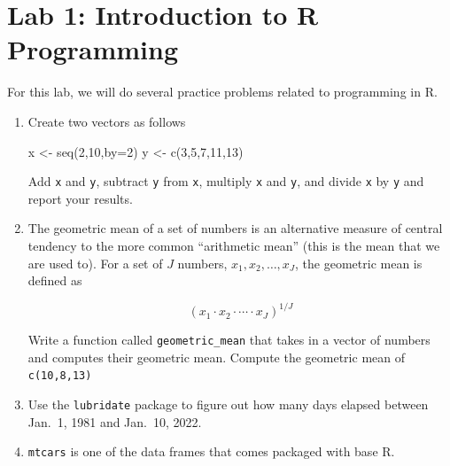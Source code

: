 \documentclass[
  letterpaper,
  DIV=11,
  numbers=noendperiod]{scrreprt}
\newenvironment{Shaded}{\begin{snugshade}}{\end{snugshade}}
\newcommand{\AttributeTok}[1]{\textcolor[rgb]{0.40,0.45,0.13}{#1}}
\newcommand{\DecValTok}[1]{\textcolor[rgb]{0.68,0.00,0.00}{#1}}
\newcommand{\FunctionTok}[1]{\textcolor[rgb]{0.28,0.35,0.67}{#1}}
\newcommand{\NormalTok}[1]{\textcolor[rgb]{0.00,0.23,0.31}{#1}}
\newcommand{\OtherTok}[1]{\textcolor[rgb]{0.00,0.23,0.31}{#1}}
\begin{document}
\section{Lab 1: Introduction to R
Programming}\label{lab-1-introduction-to-r-programming}

For this lab, we will do several practice problems related to
programming in R.

\begin{enumerate}
\def\labelenumi{\arabic{enumi}.}
\item
  Create two vectors as follows

\begin{Shaded}
\begin{Highlighting}[]
\NormalTok{x }\OtherTok{\textless{}{-}} \FunctionTok{seq}\NormalTok{(}\DecValTok{2}\NormalTok{,}\DecValTok{10}\NormalTok{,}\AttributeTok{by=}\DecValTok{2}\NormalTok{)}
\NormalTok{y }\OtherTok{\textless{}{-}} \FunctionTok{c}\NormalTok{(}\DecValTok{3}\NormalTok{,}\DecValTok{5}\NormalTok{,}\DecValTok{7}\NormalTok{,}\DecValTok{11}\NormalTok{,}\DecValTok{13}\NormalTok{)}
\end{Highlighting}
\end{Shaded}

  Add \texttt{x} and \texttt{y}, subtract \texttt{y} from \texttt{x},
  multiply \texttt{x} and \texttt{y}, and divide \texttt{x} by
  \texttt{y} and report your results.
\item
  The geometric mean of a set of numbers is an alternative measure of
  central tendency to the more common ``arithmetic mean'' (this is the
  mean that we are used to). For a set of \(J\) numbers,
  \(x_1,x_2,\ldots,x_J\), the geometric mean is defined as

  \[
     (x_1 \cdot x_2 \cdot \cdots \cdot x_J)^{1/J}
   \]

  Write a function called \texttt{geometric\_mean} that takes in a
  vector of numbers and computes their geometric mean. Compute the
  geometric mean of \texttt{c(10,8,13)}
\item
  Use the \texttt{lubridate} package to figure out how many days elapsed
  between Jan.~1, 1981 and Jan.~10, 2022.
\item
  \texttt{mtcars} is one of the data frames that comes packaged with
  base R.


\end{enumerate}
\end{document}

